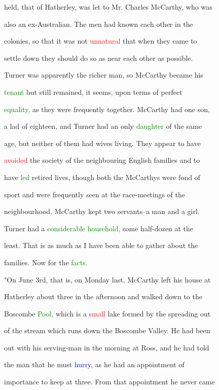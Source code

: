  held, that of Hatherley, was let to Mr. Charles McCarthy, who was

 also an ex-Australian. The men had known each other in the

 colonies, so that it was not \textcolor{red}{unnatural} that when they came to

 settle down they should do so as near each other as possible.

 Turner was apparently the richer man, so McCarthy became his

 \textcolor{green}{tenant} but still remained, it seems, upon terms of \textcolor{BurntOrange}{perfect}

 \textcolor{green}{equality,} as they were frequently together. McCarthy had one son,

 a lad of eighteen, and Turner had an only \textcolor{green}{daughter} of the same

 age, but neither of them had wives living. They appear to have

 \textcolor{red}{avoided} the society of the neighbouring English families and to

 have \textcolor{green}{led} retired lives, though both the McCarthys were fond of

 sport and were frequently seen at the race-meetings of the

 neighbourhood. McCarthy kept two servants--a man and a girl.

 Turner had a \textcolor{green}{considerable} \textcolor{green}{household,} some half-dozen at the

 least. That is as much as I have been able to gather about the

 families. Now for the \textcolor{green}{facts.}



 "On June 3rd, that is, on Monday last, McCarthy left his house at

 Hatherley about three in the afternoon and walked down to the

 Boscombe \textcolor{green}{Pool,} which is a \textcolor{red}{small} lake formed by the spreading out

 of the stream which runs down the Boscombe Valley. He had been

 out with his serving-man in the morning at Ross, and he had told

 the man that he must \textcolor{blue}{hurry,} as he had an appointment of

 \textcolor{BurntOrange}{importance} to keep at three. From that appointment he never came

